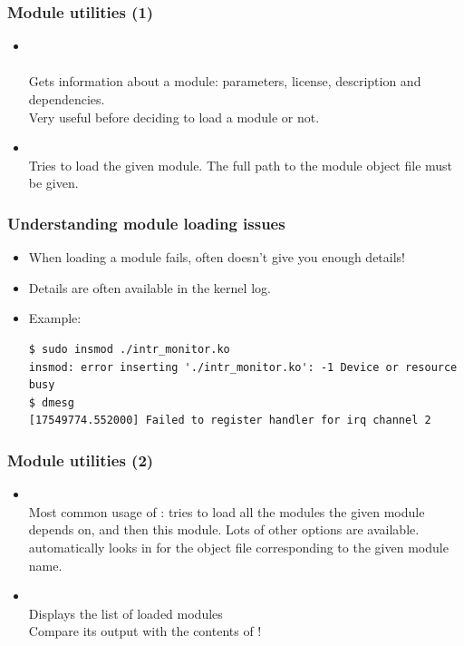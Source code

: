 \begin{frame}
  \frametitle{Module utilities (1)}
  \begin{itemize}
  \item {}\\
    \\
    Gets information about a module: parameters, license, description
    and dependencies.\\
    Very useful before deciding to load a module or not.
  \item {}\\
    Tries to load the given module. The full path to the module object
    file must be given.
  \end{itemize}
\end{frame}

\begin{frame}[fragile]
  \frametitle{Understanding module loading issues}
  \begin{itemize}
  \item When loading a module fails,  often doesn't give
    you enough details!
  \item Details are often available in the kernel log.
  \item Example:\\
\scriptsize
\begin{verbatim}
$ sudo insmod ./intr_monitor.ko
insmod: error inserting './intr_monitor.ko': -1 Device or resource busy
$ dmesg
[17549774.552000] Failed to register handler for irq channel 2
\end{verbatim}
  \end{itemize}
\end{frame}

\begin{frame}
  \frametitle{Module utilities (2)}
  \begin{itemize}
  \item {}\\
    Most common usage of : tries to load all the
    modules the given module depends on, and then this module. Lots of
    other options are available.  automatically looks in
     for the object file corresponding
    to the given module name.
  \item {}\\
    Displays the list of loaded modules\\
    Compare its output with the contents of !
  \end{itemize}
\end{frame}

